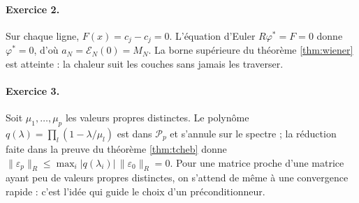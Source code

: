\documentclass[11pt,a4paper]{article}
\theoremstyle{plain}
\theoremstyle{definition}
\theoremstyle{remark}
\newcommand{\E}{\mathcal{E}}
\begin{document}
\paragraph{Exercice 2.} Sur chaque ligne, $F(x)=c_j-c_j=0$. L'équation d'Euler $R\varphi^*=F=0$ donne $\varphi^*=0$, d'où $a_N=\E_N(0)=M_N$. La borne supérieure du théorème \ref{thm:wiener} est atteinte : la chaleur suit les couches sans jamais les traverser.

\paragraph{Exercice 3.} Soit $\mu_1,\dots,\mu_p$ les valeurs propres distinctes. Le polynôme $q(\lambda)=\prod_l(1-\lambda/\mu_l)$ est dans $\mathcal P_p$ et s'annule sur le spectre ; la réduction faite dans la preuve du théorème \ref{thm:tcheb} donne $\|\varepsilon_p\|_R\leq\max_i|q(\lambda_i)|\,\|\varepsilon_0\|_R=0$. Pour une matrice proche d'une matrice ayant peu de valeurs propres distinctes, on s'attend de même à une convergence rapide : c'est l'idée qui guide le choix d'un préconditionneur.
\end{document}
